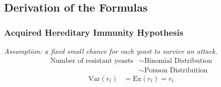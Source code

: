 \documentclass[UTF-8]{article}
\begin{document}
\subsection{Derivation of the Formulas}
\subsubsection{Acquired Hereditary Immunity Hypothesis}
\textit{Assumption: a fixed small chance for each yeast to survive an attack.}
\begin{align}
    \text{Number of resistant yeasts}&\sim\text{Binomial Distribution}\\
    &\sim\text{Poisson Distribution}
\end{align}
\begin{align}
    \text{Var}(r_t)&=\text{Ex}(r_t)=r_t\\
\end{align}
\end{document}
